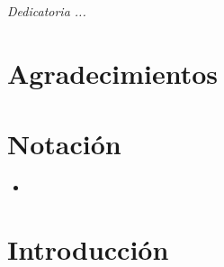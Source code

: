 \documentclass[letterpaper,12pt,oneside]{book}
\begin{document}
                \vspace{0.5cm}
                
            
        
        \chapter*{}
            \begin{flushright}%
                \emph{Dedicatoria ...}                        
                \thispagestyle{empty}
            \end{flushright}
            
       
        \chapter{Agradecimientos}
                
       
        \chapter{Notación}
            \begin{itemize}
                \item 
            \end{itemize}

        \newpage
        \tableofcontents
        \newpage
        \listoffigures

        \mainmatter

       
        \chapter{Introducción}

\end{document}
